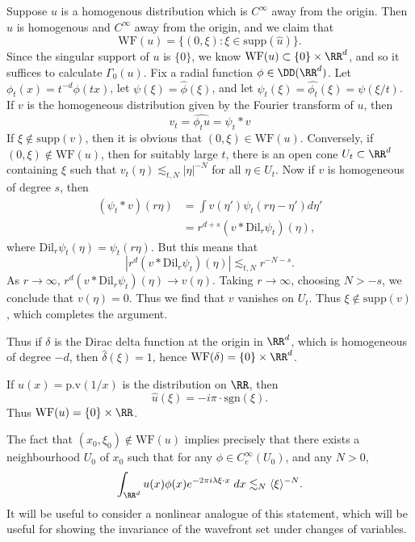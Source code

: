 \begin{example}
  Suppose $u$ is a homogenous distribution which is $C^\infty$ away from the origin. Then $\widehat{u}$ is homogenous and $C^\infty$ away from the origin, and we claim that
  \[ \text{WF}(u) = \{ (0,\xi): \xi \in \text{supp}(\widehat{u}) \}. \]
  Since the singular support of $u$ is $\{ 0 \}$, we know $\text{WF}(u) \subset \{ 0 \} \times \RR^d$, and so it suffices to calculate $\Gamma_0(u)$. Fix a radial function $\phi \in \DD(\RR^d)$. Let $\phi_t(x) = t^{-d} \phi(tx)$, let $\psi(\xi) = \widehat{\phi}(\xi)$, and let $\psi_t(\xi) = \widehat{\phi_t}(\xi) = \psi(\xi/t)$. If $v$ is the homogeneous distribution given by the Fourier transform of $u$, then
  \[ v_t = \widehat{\phi_t u} = \psi_t * v \]
  If $\xi \notin \text{supp}(v)$, then it is obvious that $(0,\xi) \in \text{WF}(u)$. Conversely, if $(0,\xi) \notin \text{WF}(u)$, then for suitably large $t$, there is an open cone $U_t \subset \RR^d$ containing $\xi$ such that $v_t(\eta) \lesssim_{t,N} |\eta|^{-N}$ for all $\eta \in U_t$. Now if $v$ is homogeneous of degree $s$, then
  \begin{align*}
    (\psi_t * v)(r \eta) &= \int v(\eta') \psi_t \left( r \eta - \eta' \right) d \eta'\\
    &= r^{d+s} (v * \text{Dil}_r \psi_t)(\eta),
  \end{align*}
  where $\text{Dil}_r \psi_t(\eta) = \psi_t(r\eta)$. But this means that
  \[ |r^d (v * \text{Dil}_r \psi_t)(\eta)| \lesssim_{t,N} r^{-N-s}. \]
  As $r \to \infty$, $r^d (v * \text{Dil}_r \psi_t)(\eta) \to v(\eta)$. Taking $r \to \infty$, choosing $N > -s$, we conclude that $v(\eta) = 0$. Thus we find that $v$ vanishes on $U_t$. Thus $\xi \not \in \text{supp}(v)$, which completes the argument.
\end{example}

\begin{example}
    Thus if $\delta$ is the Dirac delta function at the origin in $\RR^d$, which is homogeneous of degree $-d$, then $\widehat{\delta}(\xi) = 1$, hence $\text{WF}(\delta) = \{ 0 \} \times \RR^d$.
\end{example}

\begin{example}
    If $u(x) = \text{p.v}(1/x)$ is the distribution on $\RR$, then
    \[ \widehat{u}(\xi) = -i \pi \cdot \text{sgn}(\xi). \]
    Thus $\text{WF}(u) = \{ 0 \} \times \RR$.
\end{example}

The fact that $(x_0,\xi_0) \not \in \text{WF}(u)$ implies precisely that there exists a neighbourhood $U_0$ of $x_0$ such that for any $\phi \in C_c^\infty(U_0)$, and any $N > 0$,
%
\[ \int_{\RR^d} u(x) \phi(x) e^{-2 \pi i \lambda \xi \cdot x}\; dx \lesssim_N \langle \xi \rangle^{-N}. \]
%
It will be useful to consider a nonlinear analogue of this statement, which will be useful for showing the invariance of the wavefront set under changes of variables.

